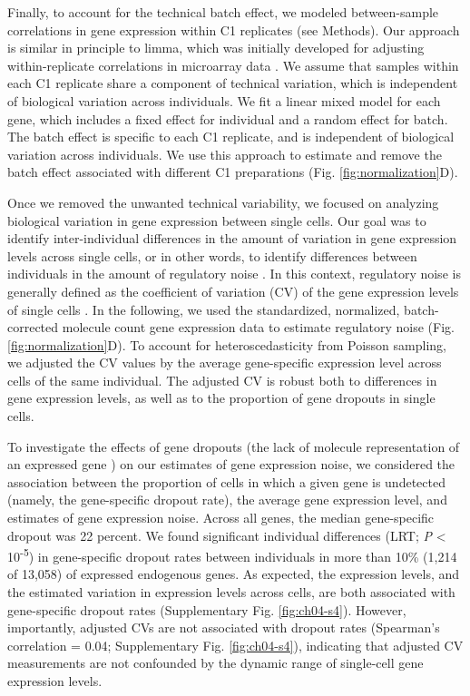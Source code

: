 Finally, to account for the technical batch effect, we modeled
between-sample correlations in gene expression within C1 replicates (see
Methods). Our approach is similar in principle to limma, which was
initially developed for adjusting within-replicate correlations in
microarray data \citep{Smyth2005}. We assume that samples within each C1
replicate share a component of technical variation, which is independent
of biological variation across individuals. We fit a linear mixed model
for each gene, which includes a fixed effect for individual and a random
effect for batch. The batch effect is specific to each C1 replicate, and
is independent of biological variation across individuals. We use this
approach to estimate and remove the batch effect associated with
different C1 preparations (Fig. \ref{fig:normalization}D).

Once we removed the unwanted technical variability, we focused on
analyzing biological variation in gene expression between single cells.
Our goal was to identify inter-individual differences in the amount of
variation in gene expression levels across single cells, or in other
words, to identify differences between individuals in the amount of
regulatory noise \citep{Raser2005}. In this context, regulatory noise is
generally defined as the coefficient of variation (CV) of the gene
expression levels of single cells \citep{Fehrmann2013}. In the following,
we used the standardized, normalized, batch-corrected molecule count
gene expression data to estimate regulatory noise (Fig. \ref{fig:normalization}D). To account
for heteroscedasticity from Poisson sampling, we adjusted the CV values
by the average gene-specific expression level across cells of the same
individual. The adjusted CV is robust both to differences in gene
expression levels, as well as to the proportion of gene dropouts in
single cells.

To investigate the effects of gene dropouts (the lack of molecule
representation of an expressed gene \citep{Brennecke2013, Shalek2013})
on our estimates of gene expression noise, we considered the association
between the proportion of cells in which a given gene is undetected
(namely, the gene-specific dropout rate), the average gene expression
level, and estimates of gene expression noise. Across all genes, the
median gene-specific dropout was 22 percent. We found significant
individual differences (LRT; \emph{P} \textless{}
10\textsuperscript{-5}) in gene-specific dropout rates between
individuals in more than 10\% (1,214 of 13,058) of expressed endogenous
genes. As expected, the expression levels, and the estimated variation
in expression levels across cells, are both associated with
gene-specific dropout rates (Supplementary Fig. \ref{fig:ch04-s4}). However,
importantly, adjusted CVs are not associated with dropout rates
(Spearman's correlation = 0.04; Supplementary Fig. \ref{fig:ch04-s4}), indicating that
adjusted CV measurements are not confounded by the dynamic range of
single-cell gene expression levels.

